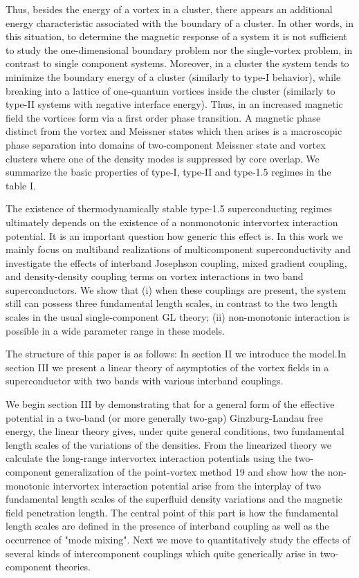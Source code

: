 Thus, besides the energy of a vortex in a cluster, there appears an additional 
energy characteristic associated with the boundary of a cluster. In other 
words, in this situation, to determine the magnetic response of a system it is 
not sufficient to study the one-dimensional boundary problem nor the 
single-vortex problem, in contrast to single component systems. Moreover, in a 
cluster the system tends to minimize the boundary energy of a cluster 
(similarly to type-I behavior), while breaking into a lattice of one-quantum 
vortices inside the cluster (similarly to type-II systems with negative 
interface energy). Thus, in an increased magnetic field the vortices form via 
a first order phase transition. A magnetic phase distinct from the vortex and 
Meissner states which then arises is a macroscopic phase separation into 
domains of two-component Meissner state and vortex clusters where one of the 
density modes is suppressed by core overlap. We summarize the basic properties 
of type-I, type-II and type-1.5 regimes in the table I.

The existence of thermodynamically stable type-1.5 superconducting regimes 
ultimately depends on the existence of a nonmonotonic intervortex interaction 
potential. It is an important question how generic this effect is. In this 
work we mainly focus on multiband realizations of multicomponent 
superconductivity and investigate the effects of interband Josephson coupling, 
mixed gradient coupling, and density-density coupling terms on vortex 
interactions in two band superconductors. We show that (i) when these 
couplings are present, the system still can possess three fundamental length 
scales, in contrast to the two length scales in the usual single-component GL 
theory; (ii) non-monotonic interaction is possible in a wide parameter range 
in these models.

The structure of this paper is as follows: In section II we introduce the 
model.In section III we present a linear theory of asymptotics of the vortex 
fields in a superconductor with two bands with various interband couplings.

We begin section III by demonstrating that for a general form of the effective 
potential in a two-band (or more generally two-gap) Ginzburg-Landau free 
energy, the linear theory gives, under quite general conditions, two 
fundamental length scales of the variations of the densities. From the 
linearized theory we calculate the long-range intervortex interaction 
potentials using the two-component generalization of the point-vortex method 
19 and show how the non-monotonic intervortex interaction potential arise from 
the interplay of two fundamental length scales of the superfluid density 
variations and the magnetic field penetration length. The central point of 
this part is how the fundamental length scales are defined in the presence of 
interband coupling as well as the occurrence of "mode mixing". Next we move to 
quantitatively study the effects of several kinds of intercomponent couplings 
which quite generically arise in two-component theories.

